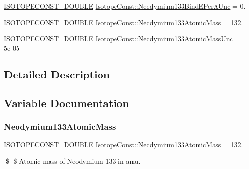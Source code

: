\begin{DoxyCompactItemize}
\mbox{\hyperlink{group___isotope_const-_macros_ga8f45a7272ce02c0b4c65c44636ed719a}{I\+S\+O\+T\+O\+P\+E\+C\+O\+N\+S\+T\+\_\+\+D\+O\+U\+B\+LE}} \mbox{\hyperlink{group___isotope_const-_neodymium-_nd133_gace3951e01396feaf2a94ae6bb5846625}{Isotope\+Const\+::\+Neodymium133\+Bind\+E\+Per\+A\+Unc}} = 0.
\item 
\mbox{\hyperlink{group___isotope_const-_macros_ga8f45a7272ce02c0b4c65c44636ed719a}{I\+S\+O\+T\+O\+P\+E\+C\+O\+N\+S\+T\+\_\+\+D\+O\+U\+B\+LE}} \mbox{\hyperlink{group___isotope_const-_neodymium-_nd133_ga72e68bbeed145d591f0506ce5fba1e8f}{Isotope\+Const\+::\+Neodymium133\+Atomic\+Mass}} = 132.
\item 
\mbox{\hyperlink{group___isotope_const-_macros_ga8f45a7272ce02c0b4c65c44636ed719a}{I\+S\+O\+T\+O\+P\+E\+C\+O\+N\+S\+T\+\_\+\+D\+O\+U\+B\+LE}} \mbox{\hyperlink{group___isotope_const-_neodymium-_nd133_ga708b66c9a4ec1ff7d685e3ba7972506c}{Isotope\+Const\+::\+Neodymium133\+Atomic\+Mass\+Unc}} = 5e-\/05
\end{DoxyCompactItemize}


\subsection{Detailed Description}


\subsection{Variable Documentation}
\mbox{\label{group___isotope_const-_neodymium-_nd133_ga72e68bbeed145d591f0506ce5fba1e8f}} 
\subsubsection{\texorpdfstring{Neodymium133\+Atomic\+Mass}{Neodymium133AtomicMass}}
{\footnotesize\ttfamily \mbox{\hyperlink{group___isotope_const-_macros_ga8f45a7272ce02c0b4c65c44636ed719a}{I\+S\+O\+T\+O\+P\+E\+C\+O\+N\+S\+T\+\_\+\+D\+O\+U\+B\+LE}} Isotope\+Const\+::\+Neodymium133\+Atomic\+Mass = 132.}

\$ \$ Atomic mass of Neodymium-\/133 in amu. \mbox{\label{group___isotope_const-_neodymium-_nd133_ga708b66c9a4ec1ff7d685e3ba7972506c}} 
